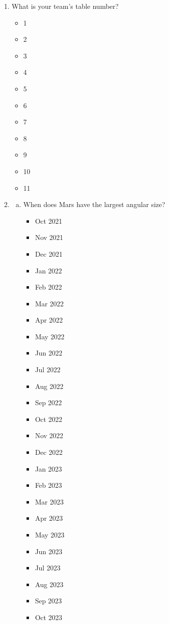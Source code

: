 \documentclass[12pt]{article}
\begin{document}
\begin{enumerate}
\item
What is your team's table number?
\begin{itemize}
    \item 1
    \item 2
    \item 3
    \item 4
    \item 5
    \item 6
    \item 7
    \item 8
    \item 9
    \item 10
    \item 11
\end{itemize}
\item
\begin{enumerate}[a.]
    \item When does Mars have the largest angular size?
    \begin{itemize}
        \item Oct 2021
        \item Nov 2021
        \item Dec 2021
        \item Jan 2022
        \item Feb 2022
        \item Mar 2022
        \item Apr 2022
        \item May 2022
        \item Jun 2022
        \item Jul 2022
        \item Aug 2022
        \item Sep 2022
        \item Oct 2022
        \item Nov 2022
        \item Dec 2022
        \item Jan 2023
        \item Feb 2023
        \item Mar 2023
        \item Apr 2023
        \item May 2023
        \item Jun 2023
        \item Jul 2023
        \item Aug 2023
        \item Sep 2023
        \item Oct 2023

\end{itemize}
\end{enumerate}
\end{enumerate}
\end{document}
